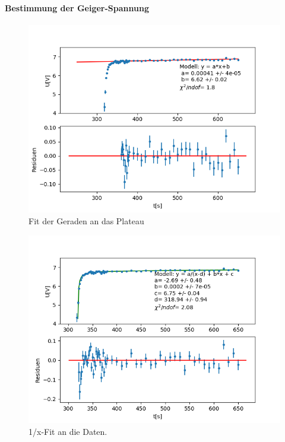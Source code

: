 \documentclass[12pt,a4paper]{article}
\begin{document}
\paragraph{Bestimmung der Geiger-Spannung}
\begin{figure}
\centering
\includegraphics[scale=0.9]{Bilder/GMGeradenfit.PNG}
\caption{Fit der Geraden an das Plateau}
\label{fig:GMGeradenfit}
\end{figure}

\begin{figure}
\centering
\includegraphics[scale=0.9]{Bilder/GMKurvenfit.PNG}
\caption{1/x-Fit an die Daten.}
\label{fig:GMKurvenfit}
\end{figure}
\end{document}
